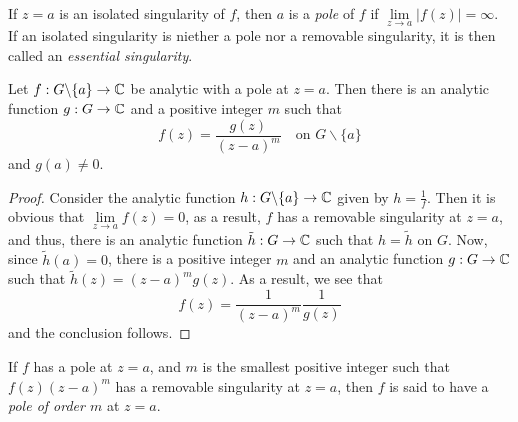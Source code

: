 \begin{definition}
    If $z = a$ is an isolated singularity of $f$, then $a$ is a \textit{pole} of $f$ if $\lim\limits_{z\to a}|f(z)| = \infty$. If an isolated singularity is niether a pole nor a removable singularity, it is then called an \textit{essential singularity}.
\end{definition}

\begin{theorem}
    Let $f: G\backslash\{a\}\to\mathbb{C}$ be analytic with a pole at $z = a$. Then there is an analytic function $g:G\to\mathbb{C}$ and a positive integer $m$ such that 
    \begin{equation*}
        f(z) = \frac{g(z)}{(z - a)^m}\quad\text{on $G\backslash\{a\}$}
    \end{equation*}
    and $g(a)\ne 0$.
\end{theorem}
\begin{proof}
    Consider the analytic function $h:G\backslash\{a\}\to\mathbb{C}$ given by $h = \frac{1}{f}$. Then it is obvious that $\lim\limits_{z\to a}f(z) = 0$, as a result, $f$ has a removable singularity at $z = a$, and thus, there is an analytic function $\tilde h: G\to\mathbb{C}$ such that $h = \tilde h$ on $G$. Now, since $\tilde h(a) = 0$, there is a positive integer $m$ and an analytic function $g:G\to\mathbb{C}$ such that $\tilde h(z) = (z - a)^m g(z)$. As a result, we see that 
    \begin{equation*}
        f(z) = \frac{1}{(z - a)^m}\frac{1}{g(z)}
    \end{equation*}
    and the conclusion follows.
\end{proof}

\begin{definition}
    If $f$ has a pole at $z = a$, and $m$ is the smallest positive integer such that $f(z)(z - a)^m$ has a removable singularity at $z = a$, then $f$ is said to have a \textit{pole of order $m$} at $z = a$.
\end{definition}
